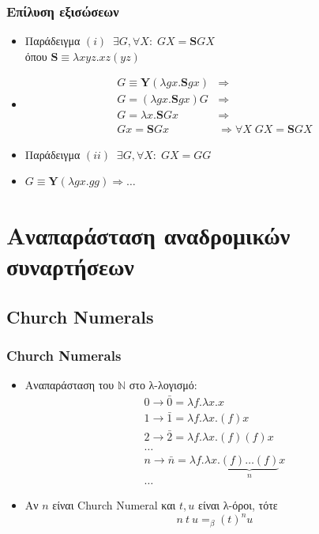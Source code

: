\documentclass{beamer}
\begin{document}
\begin{frame}
  \frametitle{Επίλυση εξισώσεων}
  \begin{itemize}
  \item Παράδειγμα $(i) \; \; \exists G, \forall X: \; G X =
    \textbf{S} G X $ \\ όπου $ \textbf{S} \equiv \lambda x y z . x z
    (y z) $ \pause
  \item $$ \begin{array}{ll}
    G \equiv \textbf{Y} (\lambda g x. \textbf{S} g x) & \Rightarrow  \\
    G = (\lambda g x. \textbf{S} g x) G & \Rightarrow  \\
    G = \lambda x . \textbf{S} G x & \Rightarrow  \\
    G x = \textbf{S} G x & \Rightarrow \forall X \; G X = \textbf{S} G X
  \end{array} $$  \pause
  \item Παράδειγμα $(ii) \; \; \exists G, \forall X: \; G X = G G $
    \pause
  \item $ G \equiv \textbf{Y} (\lambda g x. g g) \Rightarrow \ldots $
  \end{itemize}
\end{frame}

\section{Αναπαράσταση αναδρομικών συναρτήσεων}

\subsection{Church Numerals}

\begin{frame}
  \frametitle{Church Numerals}
  \begin{itemize}
  \item Αναπαράσταση του $ \mathbb{N} $ στο λ-λογισμό:
    \pause
    $$
    \begin{array}{l}
      0 \rightarrow \bar{0} = \lambda f . \lambda x . x \\
      1 \rightarrow \bar{1} = \lambda f . \lambda x . (f) x \\
      2 \rightarrow \bar{2} = \lambda f . \lambda x . (f) (f) x \\
      \ldots \\
      n \rightarrow \bar{n} = \lambda f . \lambda x . \underbrace{(f)
        \ldots (f)}_n x \\
      \ldots
    \end{array}
    $$
    \pause
  \item Αν $n $ είναι Church Numeral και $t, u$ είναι λ-όροι, τότε
    $$ n\:t\:u =_\beta (t)^n u $$
  \end{itemize}
\end{frame}
\end{document}
